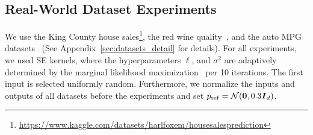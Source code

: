






\subsection{Real-World Dataset Experiments}
We use the King County house sales\footnote{\url{https://www.kaggle.com/datasets/harlfoxem/housesalesprediction}}, the red wine quality~\citep{wine_quality_186}, and the auto MPG datasets~\citep{auto_mpg_9} (See Appendix~\ref{sec:datasets_detail} for details).
%
For all experiments, we used SE kernels, where the hyperparameters $\ell$, and $\sigma^2$ are adaptively determined by the marginal likelihood maximization~\citep{Rasmussen2005-Gaussian} per 10 iterations.
%
The first input is selected uniformly random.
%
Furthermore, we normalize the inputs and outputs of all datasets before the experiments and set $p_{\rm ref} = {\cal N}(\boldsymbol{0}, 0.3 \boldsymbol{I}_d)$.

